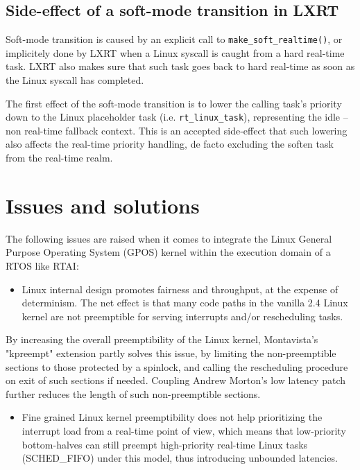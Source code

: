 \subsection{Side-effect of a soft-mode transition in LXRT}

Soft-mode transition is caused by an explicit call to
\texttt{make\_soft\_realtime()}, or implicitely done by LXRT when a Linux syscall
is caught from a hard real-time task. LXRT also makes sure that such
task goes back to hard real-time as soon as the Linux syscall has
completed.

The first effect of the soft-mode transition is to lower the calling
task's priority down to the Linux placeholder task
(i.e. \texttt{rt\_linux\_task}), representing the idle -- non real-time fallback
context. This is an accepted side-effect that such lowering also
affects the real-time priority handling, de facto excluding the soften
task from the real-time realm.


\section{Issues and solutions}

The following issues are raised when it comes to integrate the Linux
General Purpose Operating System (GPOS) kernel within the execution 
domain of a RTOS like RTAI:

\begin{itemize}

\item Linux internal design promotes fairness and throughput, at the
expense of determinism. The net effect is that many code paths in the
vanilla 2.4 Linux kernel are not preemptible for serving interrupts
and/or rescheduling tasks.

\end{itemize}

By increasing the overall preemptibility of the Linux
kernel, Montavista's "kpreempt" extension partly solves this
issue, by limiting the non-preemptible sections to those
protected by a spinlock, and calling the rescheduling
procedure on exit of such sections if needed. Coupling Andrew
Morton's low latency patch further reduces the length of such
non-preemptible sections.

\begin{itemize}

\item Fine grained Linux kernel preemptibility does not help prioritizing
the interrupt load from a real-time point of view, which means that low-priority
bottom-halves can still preempt high-priority real-time Linux tasks
(SCHED\_FIFO) under this model, thus introducing unbounded latencies.

\end{itemize}

